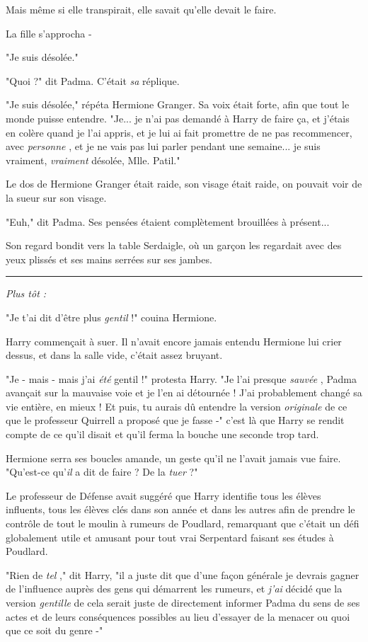 Mais même si elle transpirait, elle savait qu'elle devait le faire.

La fille s'approcha -

"Je suis désolée."

"Quoi ?" dit Padma. C'était \emph{sa}  réplique.

"Je suis désolée," répéta Hermione Granger. Sa voix était forte, afin que tout le monde puisse entendre. "Je... je n'ai pas demandé à Harry de faire ça, et j'étais en colère quand je l'ai appris, et je lui ai fait promettre de ne pas recommencer, avec \emph{personne} , et je ne vais pas lui parler pendant une semaine... je suis vraiment, \emph{vraiment } désolée, Mlle. Patil."

Le dos de Hermione Granger était raide, son visage était raide, on pouvait voir de la sueur sur son visage.

"Euh," dit Padma. Ses pensées étaient complètement brouillées à présent...

Son regard bondit vers la table Serdaigle, où un garçon les regardait avec des yeux plissés et ses mains serrées sur ses jambes.
\par\noindent\rule{\textwidth}{0.4pt}
\emph{Plus tôt :} 

"Je t'ai dit d'être plus \emph{gentil}  !" couina Hermione.

Harry commençait à suer. Il n'avait encore jamais entendu Hermione lui crier dessus, et dans la salle vide, c'était assez bruyant.

"Je - mais - mais j'ai \emph{été}  gentil !" protesta Harry. "Je l'ai presque \emph{sauvée} , Padma avançait sur la mauvaise voie et je l'en ai détournée ! J'ai probablement changé sa vie entière, en mieux ! Et puis, tu aurais dû entendre la version \emph{originale}  de ce que le professeur Quirrell a proposé que je fasse -" c'est là que Harry se rendit compte de ce qu'il disait et qu'il ferma la bouche une seconde trop tard.

Hermione serra ses boucles amande, un geste qu'il ne l'avait jamais vue faire. "Qu'est-ce qu'\emph{il } a dit de faire ? De la \emph{tuer}  ?"

Le professeur de Défense avait suggéré que Harry identifie tous les élèves influents, tous les élèves clés dans son année et dans les autres afin de prendre le contrôle de tout le moulin à rumeurs de Poudlard, remarquant que c'était un défi globalement utile et amusant pour tout vrai Serpentard faisant ses études à Poudlard.

"Rien de \emph{tel} ," dit Harry, "il a juste dit que d'une façon générale je devrais gagner de l'influence auprès des gens qui démarrent les rumeurs, et \emph{j'ai}  décidé que la version \emph{gentille}  de cela serait juste de directement informer Padma du sens de ses actes et de leurs conséquences possibles au lieu d'essayer de la menacer ou quoi que ce soit du genre -"

